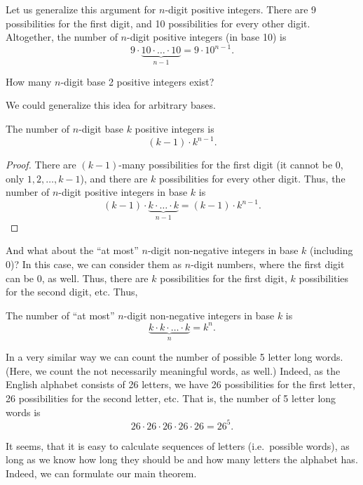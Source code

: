 Let us generalize this argument for $n$-digit positive integers. 
There are 9 possibilities for the first digit, 
and 10 possibilities for every other digit. 
Altogether, the number of $n$-digit positive integers (in base 10) is
\[
9 \cdot \underbrace{10 \cdot \dots \cdot 10}_{n-1} = 9\cdot 10^{n-1}. 
\]

\begin{exercise}\label{ex:noofbase2numbers}
How many $n$-digit base 2 positive integers exist? 
\end{exercise}

We could generalize this idea for arbitrary bases. 

\begin{proposition}\label{prop:numberofndigitbasek}
The number of $n$-digit base $k$ positive integers is 
\[
(k-1) \cdot k^{n-1}.
\] 
\end{proposition}

\begin{proof}
There are $(k-1)$-many possibilities for the first digit (it cannot be 0, only $1, 2, \dots, k-1$), 
and there are $k$ possibilities for every other digit. 
Thus, the number of $n$-digit positive integers in base $k$ is
\[
(k-1) \cdot \underbrace{k \cdot \dots \cdot k}_{n-1} = (k-1) \cdot k^{n-1}. 
\]
\end{proof}

And what about the ``at most'' $n$-digit non-negative integers in base $k$ (including 0)? 
In this case, we can consider them as $n$-digit numbers, 
where the first digit can be 0, as well. 
Thus, there are $k$ possibilities for the first digit, 
$k$ possibilities for the second digit, etc. 
Thus, 
\begin{proposition}\label{prop:numberofnatmostdigitbasek}
The number of ``at most'' $n$-digit non-negative integers in base $k$ is
\[
\underbrace{k \cdot k \cdot \dots \cdot k}_{n} = k^n. 
\]
\end{proposition}

In a very similar way we can count the number of possible 5 letter long words. 
(Here, we count the not necessarily meaningful words, as well.)
Indeed, 
as the English alphabet consists of 26 letters, 
we have 26 possibilities for the first letter, 
26 possibilities for the second letter, etc. 
That is, 
the number of 5 letter long words is 
\[
26 \cdot 26 \cdot 26 \cdot 26 \cdot 26 = 26^5. 
\]

It seems, that it is easy to calculate sequences of letters (i.e.\ possible words), 
as long as we know how long they should be and how many letters the alphabet has. 
Indeed, we can formulate our main theorem. 

